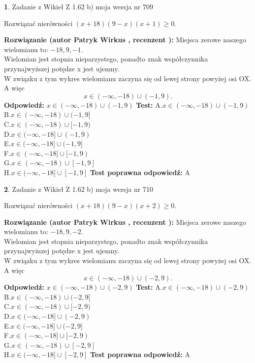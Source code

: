 \documentclass[12pt, a4paper]{article}
\theoremstyle{definition} %
\newtheorem{zad}{}
\newcommand{\zadStart}[1]{\begin{zad}#1\newline}
\newcommand{\zadStop}{\end{zad}}
\newcommand{\rozwStart}[2]{\noindent \textbf{Rozwiązanie (autor #1 , recenzent #2): }\newline}
\newcommand{\rozwStop}{\newline}
\newcommand{\odpStart}{\noindent \textbf{Odpowiedź:}\newline}
\newcommand{\odpStop}{\newline}
\newcommand{\testStart}{\noindent \textbf{Test:}\newline}
\newcommand{\testStop}{\newline}
\newcommand{\kluczStart}{\noindent \textbf{Test poprawna odpowiedź:}\newline}
\newcommand{\kluczStop}{\newline}
\begin{document}
\zadStart{Zadanie z Wikieł Z 1.62 b) moja wersja nr 709}

Rozwiązać nierówności $(x+18)(9-x)(x+1)\ge0$.
\zadStop
\rozwStart{Patryk Wirkus}{}
Miejsca zerowe naszego wielomianu to: $-18, 9, -1$.\\
Wielomian jest stopnia nieparzystego, ponadto znak współczynnika przy\linebreak najwyższej potędze x jest ujemny.\\ W związku z tym wykres wielomianu zaczyna się od lewej strony powyżej osi OX. A więc $$x \in (-\infty,-18) \cup (-1,9).$$
\rozwStop
\odpStart
$x \in (-\infty,-18) \cup (-1,9)$
\odpStop
\testStart
A.$x \in (-\infty,-18) \cup (-1,9)$\\
B.$x \in (-\infty,-18) \cup (-1,9]$\\
C.$x \in (-\infty,-18) \cup [-1,9)$\\
D.$x \in (-\infty,-18] \cup (-1,9)$\\
E.$x \in (-\infty,-18] \cup (-1,9]$\\
F.$x \in (-\infty,-18] \cup [-1,9)$\\
G.$x \in (-\infty,-18) \cup [-1,9]$\\
H.$x \in (-\infty,-18] \cup [-1,9]$
\testStop
\kluczStart
A
\kluczStop



\zadStart{Zadanie z Wikieł Z 1.62 b) moja wersja nr 710}

Rozwiązać nierówności $(x+18)(9-x)(x+2)\ge0$.
\zadStop
\rozwStart{Patryk Wirkus}{}
Miejsca zerowe naszego wielomianu to: $-18, 9, -2$.\\
Wielomian jest stopnia nieparzystego, ponadto znak współczynnika przy\linebreak najwyższej potędze x jest ujemny.\\ W związku z tym wykres wielomianu zaczyna się od lewej strony powyżej osi OX. A więc $$x \in (-\infty,-18) \cup (-2,9).$$
\rozwStop
\odpStart
$x \in (-\infty,-18) \cup (-2,9)$
\odpStop
\testStart
A.$x \in (-\infty,-18) \cup (-2,9)$\\
B.$x \in (-\infty,-18) \cup (-2,9]$\\
C.$x \in (-\infty,-18) \cup [-2,9)$\\
D.$x \in (-\infty,-18] \cup (-2,9)$\\
E.$x \in (-\infty,-18] \cup (-2,9]$\\
F.$x \in (-\infty,-18] \cup [-2,9)$\\
G.$x \in (-\infty,-18) \cup [-2,9]$\\
H.$x \in (-\infty,-18] \cup [-2,9]$
\testStop
\kluczStart
A
\kluczStop
\end{document}
